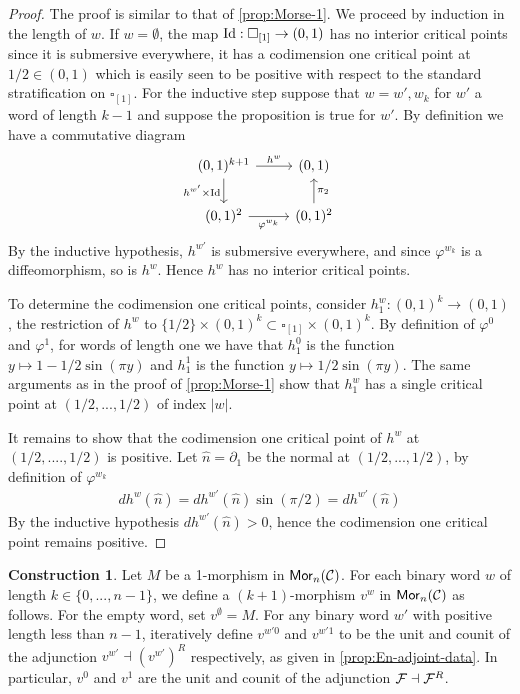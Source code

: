 \documentclass[10pt, reqno, twoside
, final
]{amsart}
\numberwithin{equation}{subsection}%
\theoremstyle{definition}
\theoremstyle{definition}
\theoremstyle{definition}
\theoremstyle{definition}
\newtheorem{cons}[defn]{Construction}
\theoremstyle{definition}
\theoremstyle{definition}
\theoremstyle{definition}
\theoremstyle{definition}
\theoremstyle{definition}
\theoremstyle{plain}
\theoremstyle{definition}
\theoremstyle{plain}
\theoremstyle{definition}
\theoremstyle{plain}
\theoremstyle{definition}
\theoremstyle{definition}
\theoremstyle{plain}
\theoremstyle{plain}
\theoremstyle{definition}
\theoremstyle{plain}
\theoremstyle{plain}
\theoremstyle{plain}
\begin{document}
\begin{proof}
The proof is similar to that of \cref{prop:Morse-1}. We proceed by induction in the length of $w$. If $w=\emptyset$, the map $\text{Id}:\square_{[1]} \to (0,1)$ has no interior critical points since it is submersive everywhere, it has a codimension one critical point at $1/2 \in (0,1)$ which is easily seen to be positive with respect to the standard stratification on $\square_{[1]}$. For the inductive step suppose that $w = w',w_k$ for $w'$ a word of length $k-1$ and suppose the proposition is true for $w'$. By definition we have a commutative diagram
\begin{equation*}
    \begin{tikzcd}[row sep=small,column sep=small]
	{(0,1)^{k+1}} && {(0,1)} \\
	\\
	{(0,1)^2} && {(0,1)^2}
	\arrow["{h^w}", from=1-1, to=1-3]
	\arrow["{h^{w'}\times\Id}"', from=1-1, to=3-1]
	\arrow["{\varphi^{w_k}}"', from=3-1, to=3-3]
	\arrow["{\pi_2}"', from=3-3, to=1-3]
\end{tikzcd}
\end{equation*}
By the inductive hypothesis, $h^{w'}$ is submersive everywhere, and since $\varphi^{w_k}$ is a diffeomorphism, so is $h^{w}$. Hence $h^w$ has no interior critical points.

To determine the codimension one critical points, consider $h^{w}_1:(0,1)^k \to (0,1)$, the restriction of $h^{w}$ to $\{1/2\}\times (0,1)^k \subset \square_{[1]} \times (0,1)^k$. By definition of $\varphi^{0}$ and $\varphi^1$, for words of length one we have that $h^{0}_1$ is the function $ y \mapsto 1-1/2\sin(\pi y)$ and $h_1^1$ is the function $y \mapsto 1/2\sin(\pi y)$. The same arguments as in the proof of \cref{prop:Morse-1} show that $h^{w}_1$ has a single critical point at $(1/2,...,1/2)$ of index $|w|$. 

It remains to show that the codimension one critical point of $h^{w}$ at $(1/2,....,1/2)$ is positive. Let $\hat{n} =\partial_1$ be the normal at $(1/2,...,1/2)$, by definition of $\varphi^{w_k}$
\begin{align*}
    dh^{w}(\hat{n}) =  dh^{w'}(\hat{n})\sin(\pi/2) = dh^{w'}(\hat{n})
\end{align*}
By the inductive hypothesis $dh^{w'}(\hat{n}) > 0$, hence the codimension one critical point remains positive.
\end{proof}


\begin{cons}
Let $M$ be a 1-morphism in $\mathsf{Mor}_n(\mathcal{C})$. For each binary word $w$ of length $k \in \{0,...,n-1\}$, we define a $(k+1)$-morphism $v^{w}$ in $\mathsf{Mor}_n(\mathcal{C})$ as follows. For the empty word, set $v^{\emptyset} = M$. For any binary word $w'$ with positive length less than $n-1$, iteratively define $v^{w'0}$ and $v^{w'1}$ to be the unit and counit of the adjunction $v^{w'} \dashv (v^{w'})^R$ respectively, as given in \cref{prop:En-adjoint-data}. In particular, $v^{0}$ and $v^{1}$ are the unit and counit of the adjunction $\mathcal{F} \dashv \mathcal{F}^R$.
\end{cons}
\end{document}
